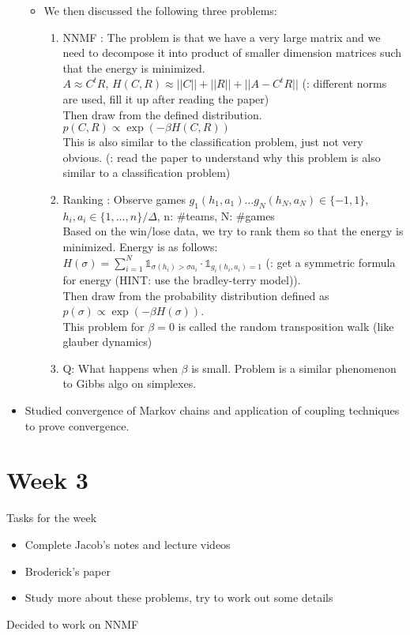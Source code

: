 \documentclass{article}
\begin{document}
\begin{itemize}
\begin{itemize}
					\item We then discussed the following three problems:
						\begin{enumerate}
							\item NNMF : The problem is that we have a very large matrix and we need to decompose it into product of smaller dimension matrices such that the energy is minimized. \\
							$A \approx C^tR$, $H(C, R) \approx ||C|| + ||R|| + ||A-C^tR||$ (\todo: different norms are used, fill it up after reading the paper)\\
							Then draw from the defined distribution. $p(C, R) \propto \exp(-\beta H(C, R))$\\
							This is also similar to the classification problem, just not very obvious. (\todo: read the paper to understand why this problem is also similar to a classification problem)
							\item Ranking : Observe games $g_1(h_1, a_1) \dots g_N(h_N, a_N) \in \{-1, 1\}$, $h_i, a_i \in \{1, \dots, n\}/\Delta$, n: \#teams, N: \#games\\
							Based on the win/lose data, we try to rank them so that the energy is minimized. Energy is as follows: $H(\sigma) = \sum_{i = 1}^N \mathbb{1}_{\sigma(h_i)>\sigma{a_i}}\cdot\mathbb{1}_{g_i(h_i, a_i) = 1}$ (\todo: get a symmetric formula for energy (HINT: use the bradley-terry model)).\\
							Then draw from the probability distribution defined as $p(\sigma) \propto \exp(-\beta H(\sigma))$.\\
							This problem for $\beta = 0$ is called the random transposition walk (like glauber dynamics)
							\item Q: What happens when $\beta$ is small. Problem is a similar phenomenon to Gibbs algo on simplexes.
						\end{enumerate}
				\end{itemize}
			\item Studied convergence of Markov chains and application of coupling techniques to prove convergence.
		\end{itemize}

	\section{Week 3}
		Tasks for the week
		\begin{itemize}
			\item Complete Jacob's notes and lecture videos
			\item Broderick's paper
   			\item Study more about these problems, try to work out some details
		\end{itemize}
		Decided to work on NNMF
\end{document}
